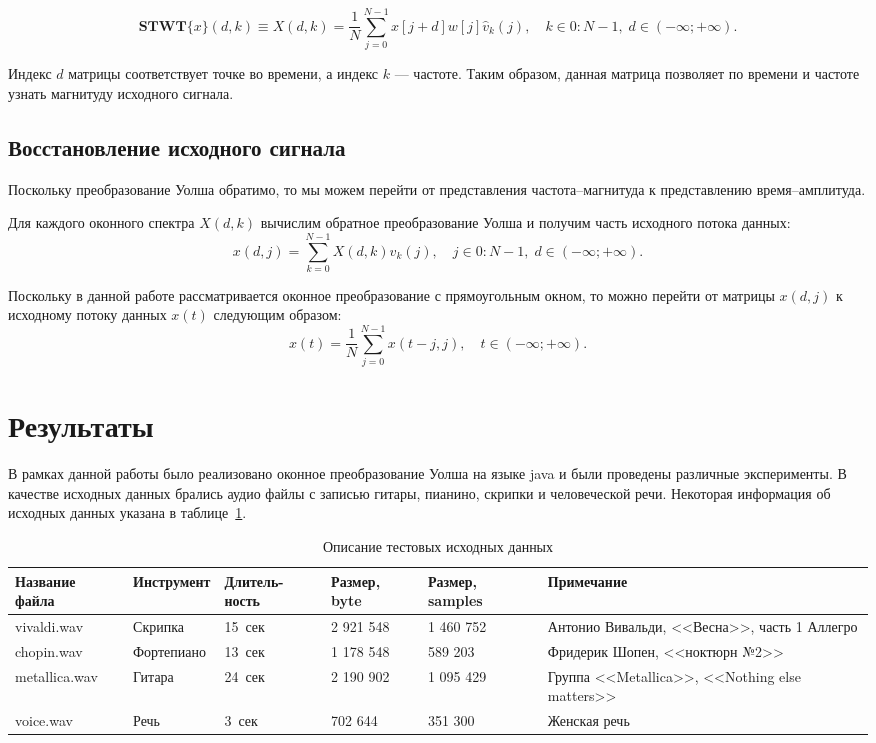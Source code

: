 \documentclass{matmex-diploma-custom}
\begin{document}
\[ 
\mathbf{STWT}\{x\}(d,k)\equiv X(d,k) 
= \frac{1}{N} \sum_{j=0}^{N-1} x[j+d]w[j]\hat{v}_k(j),
\quad k \in 0:N-1, \; d \in (-\infty; +\infty).
\]

Индекс $d$ матрицы соответствует точке во времени, а индекс $k$ --- частоте.
Таким образом, данная матрица позволяет по времени и частоте узнать 
магнитуду исходного сигнала.


\subsection{Восстановление исходного сигнала}
Поскольку преобразование Уолша обратимо, то мы
можем перейти от представления частота--магнитуда к представлению
время--амплитуда.

Для каждого оконного спектра $X(d, k)$ вычислим обратное преобразование
Уолша и получим часть исходного потока данных:
\[
x(d,j) = \sum_{k=0}^{N-1} X(d,k) \hat{v}_k(j),
\quad j \in 0:N-1, \; d \in (-\infty; +\infty).
\]

Поскольку в данной работе рассматривается оконное преобразование
с прямоугольным окном, то
можно перейти от матрицы $x(d,j)$ к исходному потоку данных $x(t)$ следующим образом:
\[
 x(t) = \frac{1}{N} \sum_{j=0}^{N-1} x(t-j,j), \quad t \in (-\infty; +\infty).
\]


\section{Результаты}
В рамках данной работы было реализовано оконное преобразование Уолша на языке java
и были проведены различные эксперименты. В качестве исходных данных брались
аудио файлы с записью гитары, пианино, скрипки и человеческой речи. Некоторая информация об
исходных данных указана в таблице~\ref{tab:audio-samples}.

\begin{table}
  \centering
    \begin{tabular}{ | p{2.4cm} | l | p{2cm} | p{2cm} | p{2cm} | p{4.5cm} |}
    \hline
    Название файла & Инструмент & Длитель-ность & Размер, byte & Размер, samples & Примечание \\ \hline
    vivaldi.wav & Скрипка & 15~сек & 2 921 548 & 1 460 752 & Антонио Вивальди, <<Весна>>, часть 1 Аллегро \\ \hline
    chopin.wav & Фортепиано & 13~сек & 1 178 548 & 589 203 & Фридерик Шопен, <<ноктюрн №2>> \\ \hline
    metallica.wav & Гитара & 24~сек & 2 190 902 & 1 095 429 & Группа <<Metallica>>, <<Nothing else matters>> \\ \hline
    voice.wav & Речь & 3~сек & 702 644 & 351 300 & Женская речь \\ \hline
    \end{tabular}
    \caption{Описание тестовых исходных данных}
    \label{tab:audio-samples}
\end{table}
\end{document}
